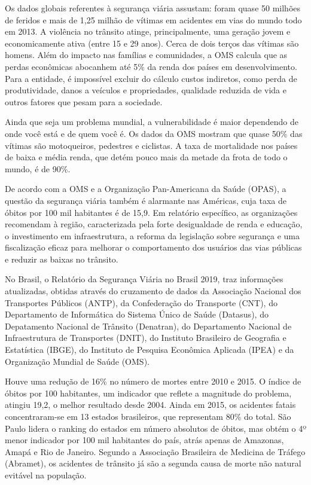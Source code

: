 Os dados globais referentes à segurança viária assustam: foram quase 50 milhões de feridos e mais de 1,25 milhão de vítimas em acidentes em vias do mundo todo em 2013. A violência no trânsito atinge, principalmente, uma geração jovem e economicamente ativa (entre 15 e 29 anos). Cerca de dois terços das vítimas são homens. Além do impacto nas famílias e comunidades, a OMS calcula que as perdas econômicas abocanhem até 5\% da renda dos países em desenvolvimento. Para a entidade, é impossível excluir do cálculo custos indiretos, como perda de produtividade, danos a veículos e propriedades, qualidade reduzida de vida e outros fatores que pesam para a sociedade.\vskip0.3cm

Ainda que seja um problema mundial, a vulnerabilidade é maior dependendo de onde você está e de quem você é. Os dados da OMS mostram que quase 50\% das vítimas são motoqueiros, pedestres e ciclistas. A taxa de mortalidade nos países de baixa e média renda, que detém pouco mais da metade da frota de todo o mundo, é de 90\%.\vskip0.3cm

De acordo com a OMS e a Organização Pan-Americana da Saúde (OPAS), a questão da segurança viária também é alarmante nas Américas, cuja taxa de óbitos por 100 mil habitantes é de 15,9. Em relatório específico, as organizações recomendam à região, caracterizada pela forte desigualdade de renda e educação, o investimento em infraestrutura, a reforma da legislação sobre segurança e uma fiscalização eficaz para melhorar o comportamento dos usuários das vias públicas e reduzir as baixas no trânsito.\vskip0.3cm


No Brasil, o Relatório da Segurança Viária no Brasil 2019,  traz informações atualizadas, obtidas através do cruzamento de dados da Associação Nacional dos Transportes Públicos (ANTP), da Confederação do Transporte (CNT), do Departamento de Informática do Sistema Único de Saúde (Datasus), do Depatamento Nacional de Trânsito (Denatran), do Departamento Nacional de Infraestrutura de Transportes (DNIT), do Instituto Brasileiro de Geografia e Estatística (IBGE), do Instituto de Pesquisa Econômica Aplicada (IPEA) e da Organização Mundial de Saúde (OMS).\vskip0.3cm

Houve uma redução de 16\% no número de mortes entre 2010 e 2015. O índice de óbitos por 100 habitantes, um indicador que reflete a magnitude do problema, atingiu 19,2, o melhor resultado desde 2004. Ainda em 2015, os acidentes fatais concentraram-se em 13 estados brasileiros, que representam 80\% do total. São Paulo lidera o ranking do estados em número absolutos de óbitos, mas obtém o 4º menor indicador por 100 mil habitantes do país, atrás apenas de Amazonas, Amapá e Rio de Janeiro. Segundo a Associação Brasileira de Medicina de Tráfego (Abramet), os acidentes de trânsito já são a segunda causa de morte não natural evitável na população.\vskip0.3cm

